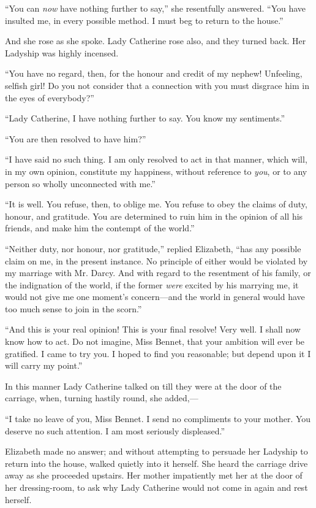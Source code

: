 ``You can \textit{now} have nothing further to say,'' she resentfully answered. ``You have insulted me, in every possible method. I must beg to return to the house.''

And she rose as she spoke. Lady Catherine rose also, and they turned back. Her Ladyship was highly incensed.

``You have no regard, then, for the honour and credit of my nephew! Unfeeling, selfish girl! Do you not consider that a connection with you must disgrace him in the eyes of everybody?''

``Lady Catherine, I have nothing further to say. You know my sentiments.''

``You are then resolved to have him?''

``I have said no such thing. I am only resolved to act in that manner, which will, in my own opinion, constitute my happiness, without reference to \textit{you}, or to any person so wholly unconnected with me.''

``It is well. You refuse, then, to oblige me. You refuse to obey the claims of duty, honour, and gratitude. You are determined to ruin him in the opinion of all his friends, and make him the contempt of the world.''

``Neither duty, nor honour, nor gratitude,'' replied Elizabeth, ``has any possible claim on me, in the present instance. No principle of either would be violated by my marriage with Mr. Darcy. And with regard to the resentment of his family, or the indignation of the world, if the former \textit{were} excited by his marrying me, it would not give me one moment's concern---and the world in general would have too much sense to join in the scorn.''

``And this is your real opinion! This is your final resolve! Very well. I shall now know how to act. Do not imagine, Miss Bennet, that your ambition will ever be gratified. I came to try you. I hoped to find you reasonable; but depend upon it I will carry my point.''

In this manner Lady Catherine talked on till they were at the door of the carriage, when, turning hastily round, she added,---

``I take no leave of you, Miss Bennet. I send no compliments to your mother. You deserve no such attention. I am most seriously displeased.''

Elizabeth made no answer; and without attempting to persuade her Ladyship to return into the house, walked quietly into it herself. She heard the carriage drive away as she proceeded upstairs. Her mother impatiently met her at the door of her dressing-room, to ask why Lady Catherine would not come in again and rest herself.

